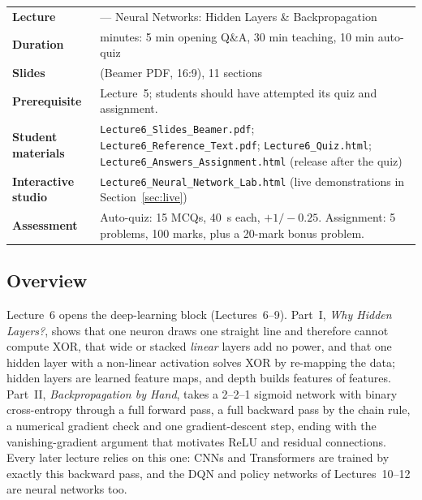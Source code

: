 \documentclass[11pt]{article}
\begin{document}
\begin{center}\small\renewcommand{\arraystretch}{1.25}\begin{tabularx}{\textwidth}{@{}>{\bfseries}p{3.3cm}>{\raggedright\arraybackslash}X@{}}\toprule

\textcolor{NavyN}{Lecture}&6 --- Neural Networks: Hidden Layers \& Backpropagation\\
\textcolor{NavyN}{Duration}&45 minutes: 5 min opening Q\&A, 30 min teaching, 10 min auto-quiz\\
\textcolor{NavyN}{Slides}&40 (Beamer PDF, 16:9), 11 sections\\
\textcolor{NavyN}{Prerequisite}&Lecture~5; students should have attempted its quiz and assignment.\\
\textcolor{NavyN}{Student materials}&\texttt{Lecture6\_Slides\_Beamer.pdf}; \texttt{Lecture6\_Reference\_Text.pdf}; \texttt{Lecture6\_Quiz.html}; \texttt{Lecture6\_Answers\_Assignment.html} (release after the quiz)\\
\textcolor{NavyN}{Interactive studio}&\texttt{Lecture6\_Neural\_Network\_Lab.html} (live demonstrations in Section~\ref{sec:live})\\
\textcolor{NavyN}{Assessment}&Auto-quiz: 15 MCQs, 40~s each, $+1/-0.25$. Assignment: 5 problems, 100 marks, plus a 20-mark bonus problem.\\\bottomrule\end{tabularx}\end{center}

\subsection*{Overview}Lecture~6 opens the deep-learning block (Lectures~6--9). Part~I, \emph{Why Hidden Layers?}, shows that one neuron draws one straight line and therefore cannot compute XOR, that wide or stacked \emph{linear} layers add no power, and that one hidden layer with a non-linear activation solves XOR by re-mapping the data; hidden layers are learned feature maps, and depth builds features of features. Part~II, \emph{Backpropagation by Hand}, takes a 2--2--1 sigmoid network with binary cross-entropy through a full forward pass, a full backward pass by the chain rule, a numerical gradient check and one gradient-descent step, ending with the vanishing-gradient argument that motivates ReLU and residual connections. Every later lecture relies on this one: CNNs and Transformers are trained by exactly this backward pass, and the DQN and policy networks of Lectures~10--12 are neural networks too.
\end{document}
